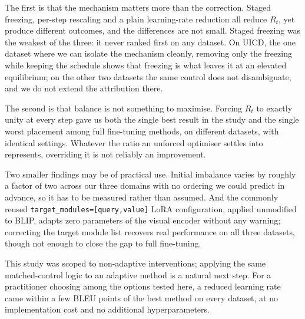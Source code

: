 \documentclass[journal]{IEEEtran}
\begin{document}
The first is that the mechanism matters more than the correction.
Staged freezing, per-step rescaling and a plain learning-rate
reduction all reduce $R_t$, yet produce different outcomes, and the
differences are not small. Staged freezing was the weakest of the
three: it never ranked first on any dataset. On UICD, the one dataset
where we can isolate the mechanism cleanly, removing only the freezing
while keeping the schedule shows that freezing is what leaves it at an
elevated equilibrium; on the other two datasets the same control does
not disambiguate, and we do not extend the attribution there.

The second is that balance is not something to maximise. Forcing
$R_t$ to exactly unity at every step gave us both the single best
result in the study and the single worst placement among full
fine-tuning methods, on different datasets, with identical
settings. Whatever the ratio an unforced optimiser settles into
represents, overriding it is not reliably an improvement.

Two smaller findings may be of practical use. Initial imbalance varies by roughly a factor of two across our three domains with no ordering we could predict in advance, so it has to be measured rather than assumed. And the commonly reused
\texttt{target\_modules=[query,value]} LoRA configuration, applied
unmodified to BLIP, adapts zero parameters of the visual encoder
without any warning; correcting the target module list recovers real performance on all three datasets, though not enough to close the gap to full fine-tuning.

This study was scoped to non-adaptive interventions; applying the same matched-control logic to an adaptive method is a natural next step. For a practitioner choosing among the options tested here, a reduced learning rate came within a few BLEU points of the best method on every dataset, at no implementation cost and no additional hyperparameters.

\FloatBarrier
\footnotesize


\end{document}
